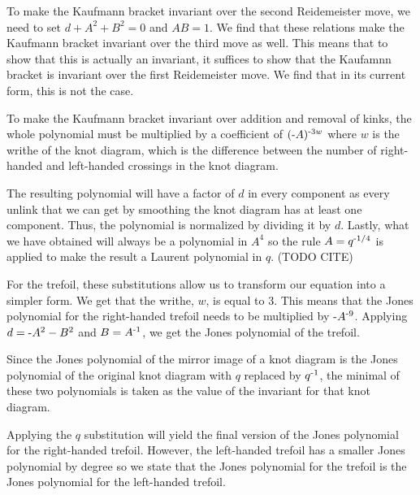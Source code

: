 \begin{paper}

To make the Kaufmann bracket invariant over the second Reidemeister move, we
need to set $d+A^2+B^2=0$ and $AB=1$.
We find that these relations make the Kaufmann bracket invariant over the third
move as well.
This means that to show that this is actually an invariant, it suffices to show
that the Kaufamnn bracket is invariant over the first Reidemeister move.
We find that in its current form, this is not the case.

To make the Kaufmann bracket invariant over addition and removal of kinks, the
whole polynomial must be multiplied by a coefficient of $(\text-A)^{\text-3w}$
where $w$ is the writhe of the knot diagram, which is the difference between the
number of right-handed and left-handed crossings in the knot diagram.


The resulting polynomial will have a factor of $d$ in every component as every
unlink that we can get by smoothing the knot diagram has at least one component.
Thus, the polynomial is normalized by dividing it by $d$.
Lastly, what we have obtained will always be a polynomial in $A^4$ so the rule
$A=q^{\text-1/4}$ is applied to make the result a Laurent polynomial in $q$.
(TODO CITE)

For the trefoil, these substitutions allow us to transform our equation into a
simpler form.
We get that the writhe, $w$, is equal to 3.
This means that the Jones polynomial for the right-handed trefoil needs to be
multiplied by $\text-A^{\text-9}$.
Applying $d=\text-A^2-B^2$ and $B=A^{\text-1}$, we get the Jones polynomial of
the trefoil.


Since the Jones polynomial of the mirror image of a knot diagram is the Jones
polynomial of the original knot diagram with $q$ replaced by $q^{\text-1}$, the
minimal of these two polynomials is taken as the value of the invariant for that
knot diagram.

Applying the $q$ substitution will yield the final version of the Jones
polynomial for the right-handed trefoil.
However, the left-handed trefoil has a smaller Jones polynomial by degree so we
state that the Jones polynomial for the trefoil is the Jones polynomial for the
left-handed trefoil.



\end{paper}

